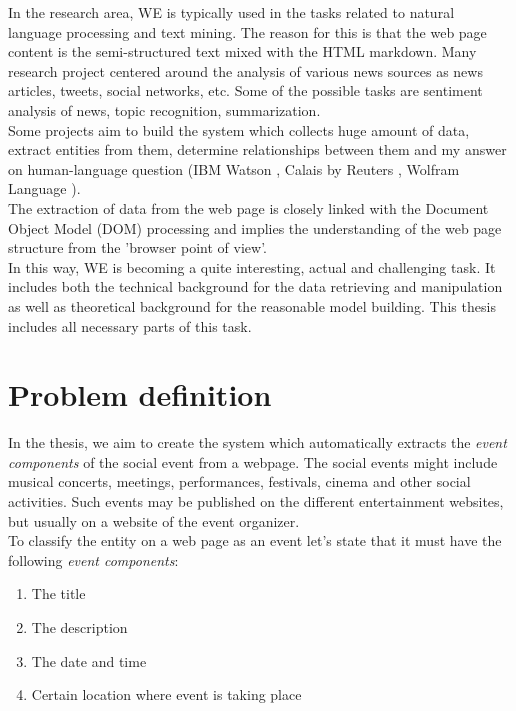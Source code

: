 In the research area, WE is typically used in the tasks related to natural language processing and text mining. The reason for this is that the web page content is the semi-structured text mixed with the HTML markdown. Many research project centered around the analysis of various news sources as news articles, tweets, social networks, etc. Some of the possible tasks are sentiment analysis of news, topic recognition, summarization. \\

Some projects aim to build the system which collects huge amount of data, extract entities from them, determine relationships between them and my answer on human-language question (IBM Watson \cite{IBMAlchemy}, Calais by Reuters \cite{Calais}, Wolfram Language \cite{Wolfram}).\\      

The extraction of data from the web page is closely linked with the Document Object Model (DOM) processing and implies the understanding of the web page structure from the 'browser point of view'. \\

In this way, WE is becoming a quite interesting, actual and challenging task. It includes both the technical background for the data retrieving and manipulation as well as theoretical background for the reasonable model building. This thesis includes all necessary parts of this task.

\section{Problem definition}
In the thesis, we aim to create the system which automatically extracts the \textit{event components} of the social event from a webpage. The social events might include musical concerts, meetings, performances, festivals, cinema and other social activities. Such events may be published on the different entertainment websites, but usually on a website of the event organizer.\\

To classify the entity on a web page as an event let's state that it must have the following \textit{event components}:
\begin{enumerate}
    \item The title
    \item The description
    \item The date and time
    \item Certain location where event is taking place
\end{enumerate}

